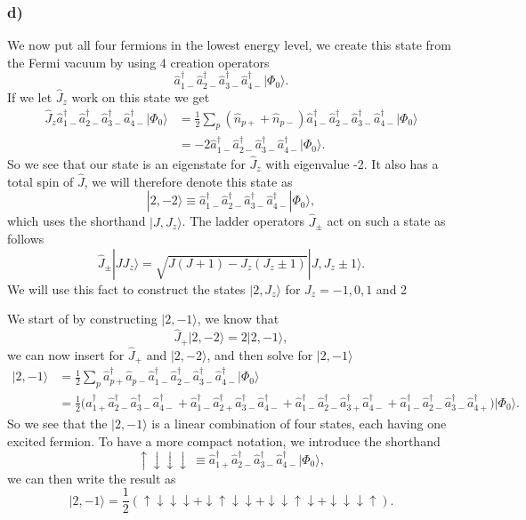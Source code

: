 \documentclass[a4paper, 11pt, notitlepage, english]{article}
\newcommand{\ket}[1]{|#1 \rangle}
\newcommand{\op}[1]{\hat{#1}}
\renewcommand{\d}{{\rm d}}
\renewcommand{\u}{\uparrow}
\renewcommand{\d}{\downarrow}
\newcommand{\uddd}{\u\d\d\d}
\newcommand{\dudd}{\d\u\d\d}
\newcommand{\ddud}{\d\d\u\d}
\newcommand{\dddu}{\d\d\d\u}
\begin{document}
\subsubsection*{d)}
We now put all four fermions in the lowest energy level, we create this state from the Fermi vacuum by using 4 creation operators
$$\op{a}_{1-}^\dagger\op{a}_{2-}^\dagger\op{a}_{3-}^\dagger\op{a}_{4-}^\dagger\ket{\Phi_0}.$$
If we let $\op{J}_z$ work on this state we get
\begin{align*}
\op{J}_z \op{a}_{1-}^\dagger\op{a}_{2-}^\dagger\op{a}_{3-}^\dagger\op{a}_{4-}^\dagger\ket{\Phi_0} &= \frac{1}{2}\sum_p (\op{n}_{p+}+\op{n}_{p-})\op{a}_{1-}^\dagger\op{a}_{2-}^\dagger\op{a}_{3-}^\dagger\op{a}_{4-}^\dagger\ket{\Phi_0} \\
&= -2 \op{a}_{1-}^\dagger\op{a}_{2-}^\dagger\op{a}_{3-}^\dagger\op{a}_{4-}^\dagger\ket{\Phi_0}.
\end{align*}
So we see that our state is an eigenstate for $\op{J}_z$ with eigenvalue -2. It also has a total spin of $\op{J}$, we will therefore denote this state as
$$\ket{2, -2} \equiv \op{a}_{1-}^\dagger\op{a}_{2-}^\dagger\op{a}_{3-}^\dagger\op{a}_{4-}^\dagger\ket{\Phi_0},$$
which uses the shorthand $\ket{J, J_z}$. The ladder operators $\op{J}_\pm$ act on such a state as follows
$$\op{J}_\pm \ket{J J_z} = \sqrt{J(J+1) - J_z(J_z \pm 1)}\ket{J, J_z \pm 1}.$$
We will use this fact to construct the states $\ket{2, J_z}$ for $J_z = -1, 0, 1$ and 2

We start of by constructing $\ket{2, -1}$, we know that
$$\op{J}_+ \ket{2, -2} = 2\ket{2, -1},$$
we can now insert for $\op{J}_+$ and $\ket{2, -2}$, and then solve for $\ket{2, -1}$
\begin{align*}
\ket{2, -1} &= \frac{1}{2}\sum_p \op{a}_{p+}^\dagger\op{a}_{p-}\op{a}_{1-}^\dagger\op{a}_{2-}^\dagger\op{a}_{3-}^\dagger\op{a}_{4-}^\dagger\ket{\Phi_0} \\
&= \frac{1}{2} \bigg(\op{a}_{1+}^\dagger\op{a}_{2-}^\dagger\op{a}_{3-}^\dagger\op{a}_{4-}^\dagger + \op{a}_{1-}^\dagger\op{a}_{2+}^\dagger\op{a}_{3-}^\dagger\op{a}_{4-}^\dagger + \op{a}_{1-}^\dagger\op{a}_{2-}^\dagger\op{a}_{3+}^\dagger\op{a}_{4-}^\dagger + \op{a}_{1-}^\dagger\op{a}_{2-}^\dagger\op{a}_{3-}^\dagger\op{a}_{4+}^\dagger\bigg)\ket{\Phi_0}.
\end{align*}
So we see that the $\ket{2, -1}$ is a linear combination of four states, each having one excited fermion. To have a more compact notation, we introduce the shorthand
$$\uparrow\downarrow\downarrow\downarrow \ \equiv\op{a}_{1+}^\dagger\op{a}_{2-}^\dagger\op{a}_{3-}^\dagger\op{a}_{4-}^\dagger\ket{\Phi_0},$$
we can then write the result as
$$\ket{2,-1} = \frac{1}{2}(\uddd + \dudd + \ddud + \dddu).$$
\end{document}
